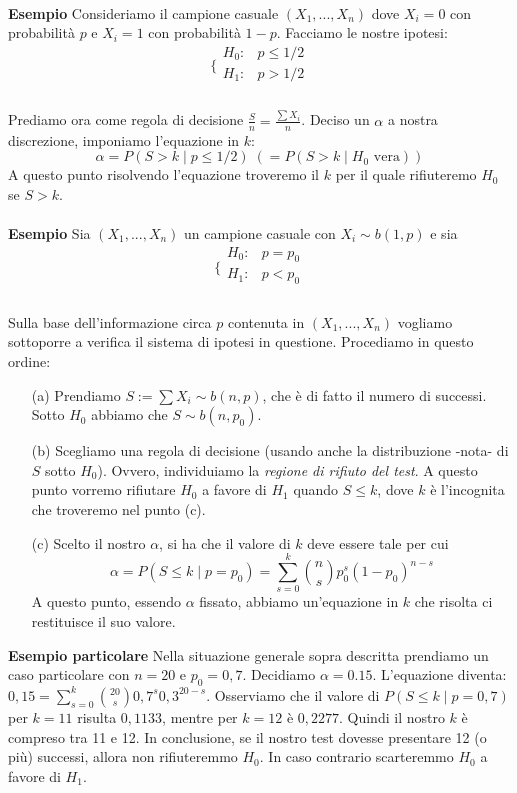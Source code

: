 \\
\noindent \textbf{Esempio} Consideriamo il campione casuale $(X_1,...,X_n)$ dove $X_i = 0$ con probabilità $p$ e $X_i = 1$ con probabilità $1-p$. Facciamo le nostre ipotesi:\\
$$\bigg \{
\begin{array}{rl}
H_0: & p \leq 1/2 \\
H_1: & p > 1/2 \\
\end{array}
$$
\\
Prediamo ora come regola di decisione $\frac{S}{n}=\frac{\sum X_i}{n}$. Deciso un $\alpha$ a nostra discrezione, imponiamo l'equazione in $k$:
$$ \alpha = P(S>k \mid p \leq 1/2) \; (= P(S>k \mid H_0 \text{ vera}))$$
A questo punto risolvendo l'equazione troveremo il $k$ per il quale rifiuteremo $H_0$ se $S>k$.\\
\\
\noindent \textbf{Esempio} Sia $(X_1,...,X_n)$ un campione casuale con $X_i \sim b(1,p)$ e sia\\
$$\bigg \{
\begin{array}{rl}
H_0: & p=p_0 \\
H_1: & p<p_0 \\
\end{array}
$$
\\
Sulla base dell'informazione circa $p$ contenuta in $(X_1,...,X_n)$ vogliamo sottoporre a verifica il sistema di ipotesi in questione. Procediamo in questo ordine:\\
\begin{enumerate}
\item [(a)] Prendiamo $S:=\sum X_i \sim b(n,p)$, che è di fatto il numero di successi. Sotto $H_0$ abbiamo che $S \sim b(n,p_0)$.
\item [(b)] Scegliamo una regola di decisione (usando anche la distribuzione -nota- di $S$ sotto $H_0$). Ovvero, individuiamo la \textit{regione di rifiuto del test}. A questo punto vorremo rifiutare $H_0$ a favore di $H_1$ quando $S \leq k$, dove $k$ è l'incognita che troveremo nel punto (c).
\item [(c)] Scelto il nostro $\alpha$, si ha che il valore di $k$ deve essere tale per cui 
			$$\alpha = P(S \leq k \mid p=p_0) = \displaystyle \sum_{s=0}^k \binom{n}{s} p_0^s (1-p_0)^{n-s}$$
A questo punto, essendo $\alpha$ fissato, abbiamo un'equazione in $k$ che risolta ci restituisce il suo valore.
\end{enumerate}
\textbf{Esempio particolare} Nella situazione generale sopra descritta prendiamo un caso particolare con $n=20$ e $p_0=0,7$. Decidiamo $\alpha = 0.15$. L'equazione diventa: $0,15 = \sum_{s=0}^k \binom{20}{s} 0,7^s 0,3^{20-s}$. Osserviamo che il valore di $P(S \leq k \mid p=0,7)$ per $k=11$ risulta $0,1133$, mentre per $k=12$ è $0,2277$. Quindi il nostro $k$ è compreso tra 11 e 12. In conclusione, se il nostro test dovesse presentare 12 (o più) successi, allora non rifiuteremmo $H_0$. In caso contrario scarteremmo $H_0$ a favore di $H_1$.

